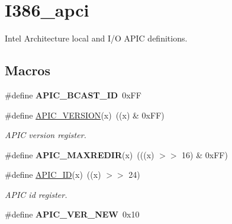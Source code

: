 \hypertarget{group__i386__apci}{}\section{I386\+\_\+apci}
\label{group__i386__apci}


Intel Architecture local and I/O A\+P\+IC definitions.  


\subsection*{Macros}
\begin{DoxyCompactItemize}
\item 
\mbox{\label{group__i386__apci_ga050314de16a7ae0bf94c1eb98e55269c}} 
\#define {\bfseries A\+P\+I\+C\+\_\+\+B\+C\+A\+S\+T\+\_\+\+ID}~0x\+FF
\item 
\mbox{\label{group__i386__apci_gaa2d8511e58fd24582e5afe3162af9136}} 
\#define \mbox{\hyperlink{group__i386__apci_gaa2d8511e58fd24582e5afe3162af9136}{A\+P\+I\+C\+\_\+\+V\+E\+R\+S\+I\+ON}}(x)~((x) \& 0x\+F\+F)
\begin{DoxyCompactList}\small\item\em A\+P\+IC version register. \end{DoxyCompactList}\item 
\mbox{\label{group__i386__apci_ga0950bec9a30d03b7e621f2d30ea8c62a}} 
\#define {\bfseries A\+P\+I\+C\+\_\+\+M\+A\+X\+R\+E\+D\+IR}(x)~(((x) $>$$>$ 16) \& 0x\+F\+F)
\item 
\mbox{\label{group__i386__apci_gad1ab7541f9494895dfd5596f0a49ea20}} 
\#define \mbox{\hyperlink{group__i386__apci_gad1ab7541f9494895dfd5596f0a49ea20}{A\+P\+I\+C\+\_\+\+ID}}(x)~((x) $>$$>$ 24)
\begin{DoxyCompactList}\small\item\em A\+P\+IC id register. \end{DoxyCompactList}\item 
\mbox{\label{group__i386__apci_ga77c8d4d17a5460611923d4648a0b51ed}} 
\#define {\bfseries A\+P\+I\+C\+\_\+\+V\+E\+R\+\_\+\+N\+EW}~0x10
\item 
\mbox{\label{group__i386__apci_ga61dd19e4f52174a32ff57925ba67416b}} 

\end{DoxyCompactItemize}
